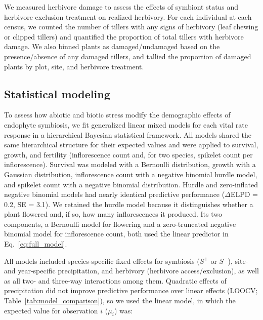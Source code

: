 \documentclass[12pt]{article}\usepackage[]{graphicx}\usepackage[dvipsnames]{xcolor}
\begin{document}
We measured herbivore damage to assess the effects of symbiont status and herbivore exclusion treatment on realized herbivory. 
For each individual at each census, we counted the number of tillers with any signs of herbivory (leaf chewing or clipped tillers) and quantified the proportion of total tillers with herbivore damage. 
We also binned plants as damaged/undamaged based on the presence/absence of any damaged tillers, and tallied the proportion of damaged plants by plot, site, and herbivore treatment.

\subsection*{Statistical modeling}
To assess how abiotic and biotic stress modify the demographic effects of endophyte symbiosis, we fit generalized linear mixed models for each vital rate response in a hierarchical Bayesian statistical framework. 
All models shared the same hierarchical structure for their expected values and were applied to survival, growth, and fertility (inflorescence count and, for two species, spikelet count per inflorescence).
Survival was modeled with a Bernoulli distribution, growth with a Gaussian distribution, inflorescence count with a negative binomial hurdle model, and spikelet count with a negative binomial distribution. 
Hurdle and zero-inflated negative binomial models had nearly identical predictive performance ($\Delta$ELPD = 0.2, SE = 3.1).
We retained the hurdle model because it distinguishes whether a plant flowered and, if so, how many inflorescences it produced. Its two components, a Bernoulli model for flowering and a zero-truncated negative binomial model for inflorescence count, both used the linear predictor in Eq.~\ref{eq:full_model}.

All models included species-specific fixed effects for symbiosis ($S^+$ or $S^-$), site- and year-specific precipitation, and herbivory (herbivore access/exclusion), as well as all two- and three-way interactions among them.
Quadratic effects of precipitation did not improve predictive performance over linear effects (LOOCV; Table~\ref{tab:model_comparison}), so we used the linear model, in which the expected value for observation $i$ ($\mu_{i}$) was:
\end{document}
